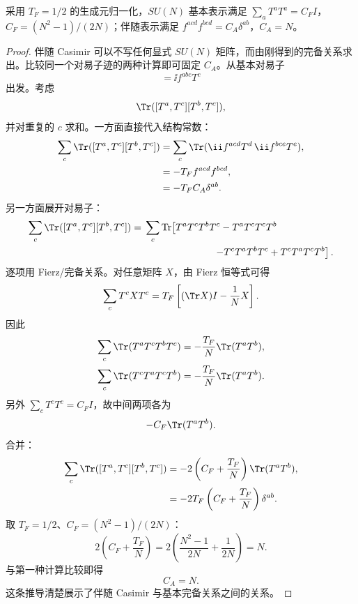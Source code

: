\begin{corollary}
采用 $T_F=1/2$ 的生成元归一化，$SU(N)$ 基本表示满足 $\sum_aT^aT^a=C_FI$，$C_F=(N^2-1)/(2N)$；伴随表示满足 $f^{acd}f^{bcd}=C_A\delta^{ab}$，$C_A=N$。
\end{corollary}
\begin{proof}
伴随 Casimir 可以不写任何显式 $SU(N)$ 矩阵，而由刚得到的完备关系求出。比较同一个对易子迹的两种计算即可固定 $C_A$。从基本对易子
\begin{equation*}
 [T^a,T^b]=\ii f^{abc}T^c
\end{equation*}
出发。考虑
\begin{equation*}
 \Tr([T^a,T^c][T^b,T^c]),
\end{equation*}
并对重复的 $c$ 求和。一方面直接代入结构常数：
\begin{align*}
 \sum_c\Tr([T^a,T^c][T^b,T^c])
 &=\sum_c\Tr(\ii f^{acd}T^d\,\ii f^{bce}T^e),\\
 &=-T_F f^{acd}f^{bcd},\\
 &=-T_F C_A\delta^{ab}.
\end{align*}
另一方面展开对易子：
\begin{align*}
 \sum_c\Tr([T^a,T^c][T^b,T^c])
 ={}&\sum_c\operatorname{Tr}\!\left[
 T^aT^cT^bT^c-T^aT^cT^cT^b\right.\\
 &\left.\hspace{2.5cm}-T^cT^aT^bT^c+T^cT^aT^cT^b
 \right].
\end{align*}
逐项用 Fierz/完备关系。对任意矩阵 $X$，由 Fierz 恒等式可得
\begin{equation*}
 \sum_c T^cXT^c
 =T_F\left[(\Tr X)I-\frac1N X\right].
\end{equation*}
因此
\begin{align*}
 \sum_c\Tr(T^aT^cT^bT^c)
 &=-\frac{T_F}{N}\Tr(T^aT^b),\\
 \sum_c\Tr(T^cT^aT^cT^b)
 &=-\frac{T_F}{N}\Tr(T^aT^b).
\end{align*}
另外 $\sum_cT^cT^c=C_FI$，故中间两项各为
\begin{equation*}
 -C_F\Tr(T^aT^b).
\end{equation*}
合并：
\begin{align*}
 \sum_c\Tr([T^a,T^c][T^b,T^c])
 &=-2\left(C_F+\frac{T_F}{N}\right)
 \Tr(T^aT^b),\\
 &=-2T_F\left(C_F+\frac{T_F}{N}\right)\delta^{ab}.
\end{align*}
取 $T_F=1/2$、$C_F=(N^2-1)/(2N)$：
\begin{equation*}
 2\left(C_F+\frac{T_F}{N}\right)
 =2\left(\frac{N^2-1}{2N}+\frac1{2N}\right)=N.
\end{equation*}
与第一种计算比较即得
\begin{equation*}
 C_A=N.
\end{equation*}
这条推导清楚展示了伴随 Casimir 与基本完备关系之间的关系。
\end{proof}

